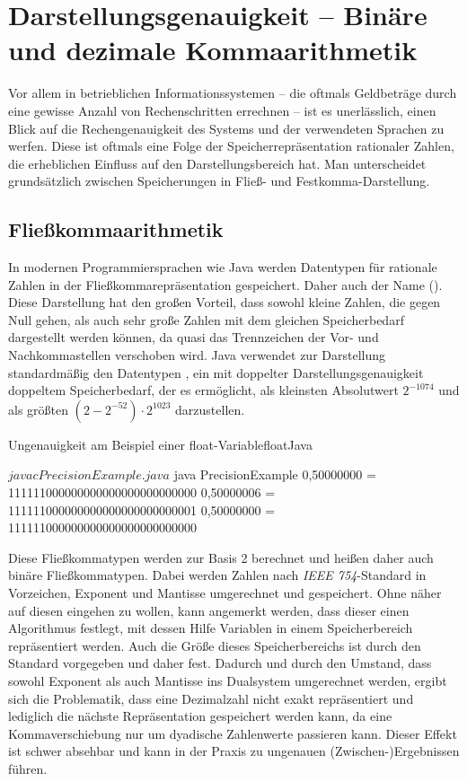 \section{Darstellungsgenauigkeit -- Binäre und dezimale Kommaarithmetik}\label{rechengenauigkeit}
Vor allem in betrieblichen Informationssystemen -- die oftmals Geldbeträge durch eine gewisse Anzahl von Rechenschritten errechnen -- ist es unerlässlich, einen Blick auf die Rechengenauigkeit des Systems und der verwendeten Sprachen zu werfen. Diese ist oftmals eine Folge der Speicherrepräsentation rationaler Zahlen, die erheblichen Einfluss auf den Darstellungsbereich hat. Man unterscheidet grundsätzlich zwischen Speicherungen in Fließ- und Festkomma-Darstellung.
 
\subsection*{Fließkommaarithmetik}
In modernen Programmiersprachen wie Java werden Datentypen für rationale Zahlen in der Fließkommarepräsentation gespeichert. Daher auch der Name  (\engl {}). Diese Darstellung hat den großen Vorteil, dass sowohl kleine Zahlen, die gegen Null gehen, als auch sehr große Zahlen mit dem gleichen Speicherbedarf dargestellt werden können, da quasi das Trennzeichen der Vor- und Nachkommastellen verschoben wird. Java verwendet zur Darstellung standardmäßig den Datentypen , ein  mit doppelter Darstellungsgenauigkeit \bzw doppeltem Speicherbedarf, der es ermöglicht, als kleinsten Absolutwert $2^{-1074}$ und als größten $(2 - 2^{-52}) \cdot 2^{1023}$ darzustellen.

\begin{codeWithCaption}{Ungenauigkeit am Beispiel einer float-Variable}{floatJava}
    \begin{shellwindow}
    $ javac PrecisionExample.java 
    $ java PrecisionExample
    0,50000000 = 111111000000000000000000000000
    0,50000006 = 111111000000000000000000000001
    0,50000000 = 111111000000000000000000000000
    \end{shellwindow}
\end{codeWithCaption}

Diese Fließkommatypen werden zur Basis 2 berechnet und heißen daher auch binäre Fließkommatypen. Dabei werden Zahlen nach \textit{IEEE 754}-Standard in Vorzeichen, Exponent und Mantisse umgerechnet und gespeichert. Ohne näher auf diesen eingehen zu wollen, kann angemerkt werden, dass dieser einen Algorithmus festlegt, mit dessen Hilfe Variablen in einem Speicherbereich repräsentiert werden. Auch die Größe dieses Speicherbereichs ist durch den Standard vorgegeben und daher fest. Dadurch und durch den Umstand, dass sowohl Exponent als auch Mantisse ins Dualsystem umgerechnet werden, ergibt sich die Problematik, dass eine Dezimalzahl \uU nicht exakt repräsentiert und lediglich die nächste Repräsentation gespeichert werden kann, da eine Kommaverschiebung nur um dyadische Zahlenwerte passieren kann. Dieser Effekt ist schwer absehbar und kann in der Praxis zu ungenauen (Zwischen-)Ergebnissen führen.

